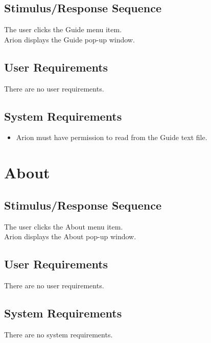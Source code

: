 \documentclass{scrreprt}
\begin{document}
    \subsection*{Stimulus/Response Sequence}
        \begin{flushleft}
             The user clicks the Guide menu item. \\
             Arion displays the Guide pop-up window. \\
        \end{flushleft}

    \subsection*{User Requirements}
    There are no user requirements.

    \subsection*{System Requirements}
        \begin{itemize}
            \item Arion must have permission to read from the Guide text file.
        \end{itemize}

\section{About}
    \subsection*{Stimulus/Response Sequence}
        \begin{flushleft}
             The user clicks the About menu item. \\
             Arion displays the About pop-up window. \\
        \end{flushleft}

    \subsection*{User Requirements}
    There are no user requirements.

    \subsection*{System Requirements}
    There are no system requirements.
\end{document}
